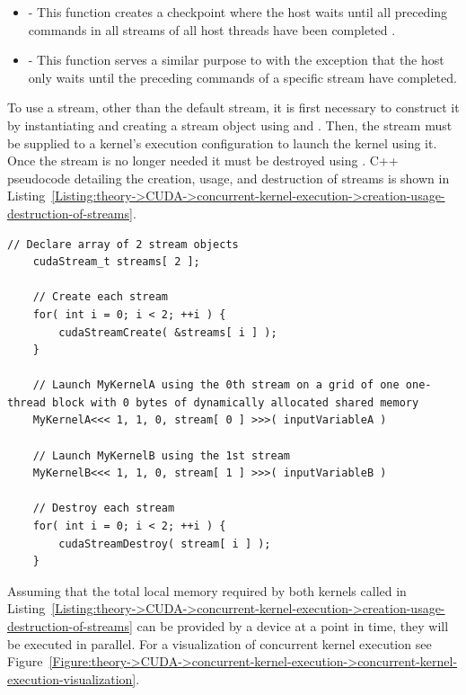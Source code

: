 \begin{itemize}
	\item {} - This function creates a checkpoint where the host waits until all preceding commands in all streams of all host threads have been completed \cite{NVIDIADecember2022}.
	\item {} - This function serves a similar purpose to  with the exception that the host only waits until the preceding commands of a specific stream have completed.
\end{itemize}

To use a stream, other than the default stream, it is first necessary to construct it by instantiating and creating a stream object using  and .
Then, the stream must be supplied to a kernel's execution configuration to launch the kernel using it.
Once the stream is no longer needed it must be destroyed using .
C++ pseudocode detailing the creation, usage, and destruction of streams is shown in Listing~\ref{Listing:theory->CUDA->concurrent-kernel-execution->creation-usage-destruction-of-streams}.

\begin{lstlisting}[caption={C++ pseudocode showcasing the creation, usage, and destruction of two streams.
Taken from \citetitle{NVIDIADecember2022} \cite{NVIDIADecember2022}.},label={Listing:theory->CUDA->concurrent-kernel-execution->creation-usage-destruction-of-streams}]
	// Declare array of 2 stream objects
	cudaStream_t streams[ 2 ];
	
	// Create each stream
	for( int i = 0; i < 2; ++i ) {
		cudaStreamCreate( &streams[ i ] );
	}
	
	// Launch MyKernelA using the 0th stream on a grid of one one-thread block with 0 bytes of dynamically allocated shared memory
	MyKernelA<<< 1, 1, 0, stream[ 0 ] >>>( inputVariableA )
	
	// Launch MyKernelB using the 1st stream
	MyKernelB<<< 1, 1, 0, stream[ 1 ] >>>( inputVariableB )
	
	// Destroy each stream
	for( int i = 0; i < 2; ++i ) {
		cudaStreamDestroy( stream[ i ] );
	}
\end{lstlisting}

Assuming that the total local memory required by both kernels called in Listing~\ref{Listing:theory->CUDA->concurrent-kernel-execution->creation-usage-destruction-of-streams} can be provided by a device at a point in time, they will be executed in parallel.
For a visualization of concurrent kernel execution see Figure~\ref{Figure:theory->CUDA->concurrent-kernel-execution->concurrent-kernel-execution-visualization}.

